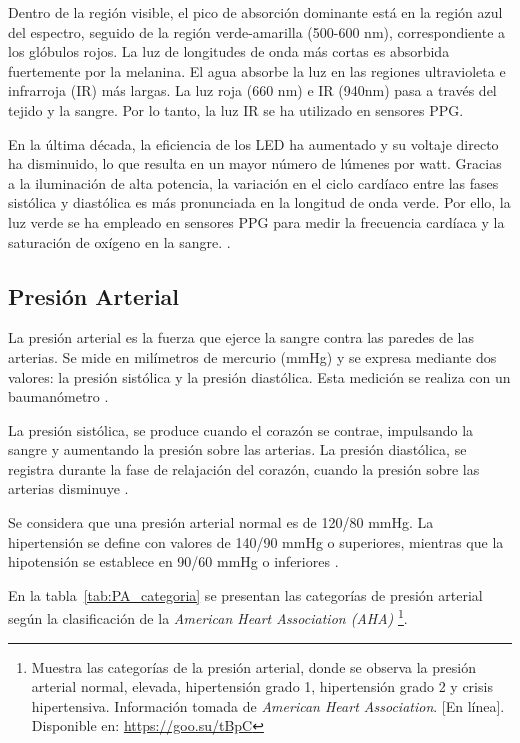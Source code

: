             Dentro de la región visible, el pico de absorción dominante está en la región azul del espectro, seguido de la región verde-amarilla (500-600 nm), correspondiente a los glóbulos rojos. La luz de longitudes de onda más cortas es absorbida fuertemente por la melanina. El agua absorbe la luz en las regiones ultravioleta e infrarroja (IR) más largas. La luz roja (660 nm) e IR (940nm) pasa a través del tejido y la sangre. Por lo tanto, la luz IR se ha utilizado en sensores PPG.
        
            En la última década, la eficiencia de los LED ha aumentado y su voltaje directo ha disminuido, lo que resulta en un mayor número de lúmenes por watt. Gracias a la iluminación de alta potencia, la variación en el ciclo cardíaco entre las fases sistólica y diastólica es más pronunciada en la longitud de onda verde. Por ello, la luz verde se ha empleado en sensores PPG para medir la frecuencia cardíaca y la saturación de oxígeno en la sangre. \cite{Tamura_2019}.

    \subsection{Presión Arterial}
    La presión arterial es la fuerza que ejerce la sangre contra las paredes de las arterias. Se mide en milímetros de mercurio (mmHg) y se expresa mediante dos valores: la presión sistólica y la presión diastólica. Esta medición se realiza con un baumanómetro \cite{PresionArterialDefinicion}.

    La presión sistólica, se produce cuando el corazón se contrae, impulsando la sangre y aumentando la presión sobre las arterias. La presión diastólica, se registra durante la fase de relajación del corazón, cuando la presión sobre las arterias disminuye \cite{fernandez_presion}.
    
    Se considera que una presión arterial normal es de 120/80 mmHg. La hipertensión se define con valores de 140/90 mmHg o superiores, mientras que la hipotensión se establece en 90/60 mmHg o inferiores \cite{DOF}.

    En la tabla~\ref{tab:PA_categoria} se presentan las categorías de presión arterial según la clasificación de la \textit{American Heart Association (AHA)} \footnote{Muestra las categorías de la presión arterial, donde se observa la presión arterial normal, elevada, hipertensión grado 1, hipertensión grado 2 y crisis hipertensiva. Información tomada de \textit{American Heart Association}. [En línea]. Disponible en: \url{https://goo.su/tBpC}}.


